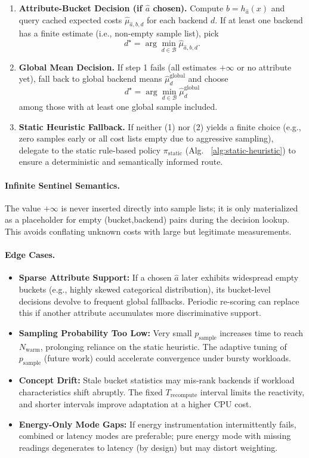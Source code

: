 \begin{enumerate}
  \item \textbf{Attribute-Bucket Decision (if $\hat{a}$ chosen).}  
    Compute $b = h_{\hat{a}}(x)$ and query cached expected costs 
    $\widehat{\mu}_{\hat{a},b,d}$ for each backend $d$.  
    If at least one backend has a finite estimate (i.e., non-empty sample list), pick
    \[
    d^\star = \arg\min_{d \in \mathcal{B}} \widehat{\mu}_{\hat{a},b,d}.
    \]
  \item \textbf{Global Mean Decision.}  
    If step 1 fails (all estimates $+\infty$ or no attribute yet), fall back to global backend means $\widehat{\mu}^{\text{global}}_d$ and choose
    \[
    d^\star = \arg\min_{d \in \mathcal{B}} \widehat{\mu}^{\text{global}}_d
    \]
    among those with at least one global sample included.
  \item \textbf{Static Heuristic Fallback.}  
    If neither (1) nor (2) yields a finite choice (e.g., zero samples early or all cost lists empty due to aggressive sampling), delegate to the static rule-based policy $\pi_{\text{static}}$ (Alg. ~\ref{alg:static-heuristic}) to ensure a deterministic and semantically informed route.
\end{enumerate}

\paragraph{Infinite Sentinel Semantics.}
The value $+\infty$ is never inserted directly into sample lists; it is only materialized as a placeholder for empty (bucket,backend) pairs during the decision lookup. This avoids conflating unknown costs with large but legitimate measurements.

\paragraph{Edge Cases.}
\begin{itemize}
  \item \textbf{Sparse Attribute Support:} If a chosen $\hat{a}$ later exhibits widespread empty buckets (e.g., highly skewed categorical distribution), its bucket-level decisions devolve to frequent global fallbacks. Periodic re-scoring can replace this if another attribute accumulates more discriminative support.
  \item \textbf{Sampling Probability Too Low:} Very small $p_{\text{sample}}$ increases time to reach $N_{\text{warm}}$, prolonging reliance on the static heuristic. The adaptive tuning of $p_{\text{sample}}$ (future work) could accelerate convergence under bursty workloads.
  \item \textbf{Concept Drift:} Stale bucket statistics may mis-rank backends if workload characteristics shift abruptly. The fixed $T_{\text{recompute}}$ interval limits the reactivity, and shorter intervals improve adaptation at a higher CPU cost.
  \item \textbf{Energy-Only Mode Gaps:} If energy instrumentation intermittently fails, combined or latency modes are preferable; pure energy mode with missing readings degenerates to latency (by design) but may distort weighting.
\end{itemize}

